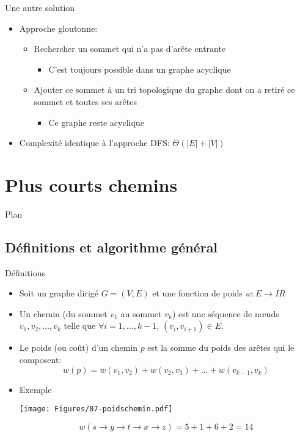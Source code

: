 \begin{frame}{Une autre solution}

\begin{itemize}
\item Approche gloutonne:
\begin{itemize}
\item Rechercher un sommet qui n'a pas d'arête entrante
\begin{itemize}
\item C'est toujours possible dans un graphe acyclique
\end{itemize}
\item Ajouter ce sommet à un tri topologique du graphe dont on a retiré ce sommet et toutes ses arêtes
\begin{itemize}
\item Ce graphe reste acyclique
\end{itemize}
\end{itemize}
\item Complexité identique à l'approche DFS: $\Theta(|E|+|V|)$
\end{itemize}

\end{frame}


\section{Plus courts chemins}

\begin{frame}{Plan}

\tableofcontents[currentsection]

\end{frame}

\subsection{Définitions et algorithme général}


\begin{frame}{Définitions}

\begin{itemize}
\item Soit un graphe dirigé $G=(V,E)$ et une fonction de poids $w:
  E\rightarrow I\!R$
\item Un chemin (du sommet $v_1$ au sommet $v_k$) est une séquence de
  n\oe uds $v_1, v_2,\ldots, v_k$ telle que $\forall i=1,\ldots,k-1$,
  $(v_i,v_{i+1})\in E$.
\item Le poids (ou coût) d'un chemin $p$ est la somme du poids des arêtes qui le composent:
$$w(p)=w(v_1,v_2)+w(v_2,v_3)+\ldots+w(v_{k-1},v_k)$$
\item Exemple
\centerline{\texttt{[image: Figures/07-poidschemin.pdf]}}
$$w(s\rightarrow y \rightarrow t\rightarrow x\rightarrow z)=5+1+6+2=14$$
\end{itemize}

\end{frame}

